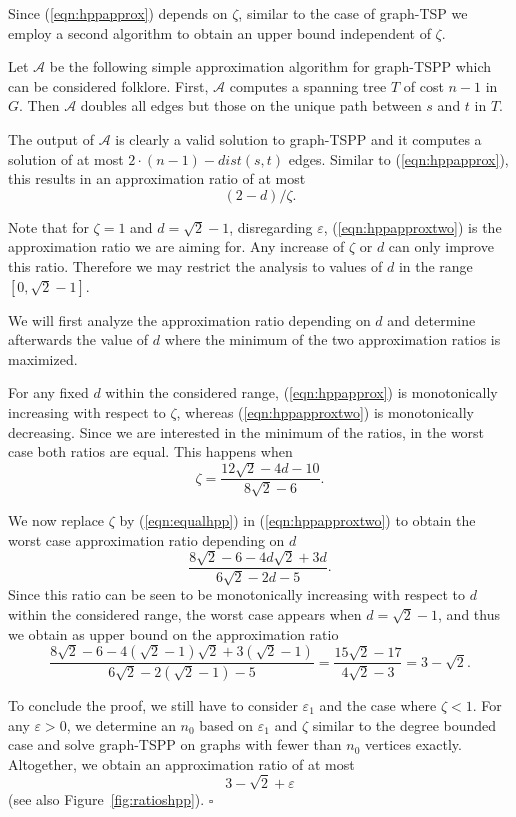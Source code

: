 \documentclass[letterpaper,11pt]{article}
\newenvironment{proof}{\begin{trivlist}
\item[\hskip\labelsep {\bf Proof}.]}{\QED \end{trivlist}}
\newcommand{\QED}{\hfill $\square$}
\newcommand{\TSP}{graph-TSP\xspace}
\newcommand{\HPP}{graph-TSPP\xspace}
\newcommand{\dist}[1]{\ensuremath{dist(#1)}}
\begin{document}
\begin{proof}
Since (\ref{eqn:hppapprox}) depends on $\zeta$, similar to the case of \TSP
we employ a second algorithm to obtain an upper bound independent of $\zeta$.

Let $\mathcal{A}$ be the following simple approximation algorithm for \HPP which
can be considered folklore.
First, $\mathcal{A}$ computes a spanning tree $T$ of cost $n-1$ in $G$. Then
$\mathcal{A}$ doubles all edges but those on the unique path between $s$ and $t$
in $T$.

The output of $\mathcal{A}$ is clearly a valid solution to \HPP and it computes
a solution of at most $2\cdot(n-1)-\dist{s,t}$ edges. Similar to
(\ref{eqn:hppapprox}), this results in an approximation ratio of at most
\begin{equation}\label{eqn:hppapproxtwo}
    (2-d)/\zeta.
\end{equation}

Note that for $\zeta=1$ and $d= \sqrt{2}-1$, disregarding $\varepsilon$,
(\ref{eqn:hppapproxtwo}) is the approximation ratio we are aiming for. Any
increase of $\zeta$ or $d$ can only improve this ratio. Therefore we may
restrict the analysis to values of $d$ in the range $[0,\sqrt{2}-1]$.

We will first analyze the approximation ratio depending on $d$ and determine
afterwards the value of $d$ where the minimum of the two
approximation ratios is maximized.

For any fixed $d$ within the considered range, (\ref{eqn:hppapprox}) is
monotonically increasing with respect to $\zeta$,
whereas (\ref{eqn:hppapproxtwo}) is monotonically decreasing. Since we are
interested in the minimum of the ratios, in the worst
case both ratios are equal. This happens when
\begin{equation}\label{eqn:equalhpp}
    \zeta = \frac{12\sqrt{2}-4d-10}{8\sqrt{2}-6}.
\end{equation}

We now replace $\zeta$
by (\ref{eqn:equalhpp}) in (\ref{eqn:hppapproxtwo}) to obtain the worst case
approximation ratio depending on $d$
\[
\frac{8\sqrt{2}-6-4d\sqrt{2}+3d}{6\sqrt{2}-2d-5}.
\]
Since this ratio can be seen to be monotonically increasing with respect to $d$ within the
considered range, the worst case appears when $d=\sqrt{2}-1$,
and thus we obtain as upper bound on the approximation ratio
\[
\frac{8\sqrt{2}-6-4(\sqrt{2}-1)\sqrt{2}+3(\sqrt{2}-1)}{6\sqrt{2}-2(\sqrt{2}-1)-5}
= \frac{15\sqrt{2}-17}{4\sqrt{2}-3} = 3 - \sqrt{2}.
\]

To conclude the proof, we still have to consider $\varepsilon_1$ and the case
where $\zeta<1$.
For any
$\varepsilon>0$, we determine an $n_0$ based on $\varepsilon_1$ and $\zeta$ similar to the degree bounded case and
solve \HPP on graphs with fewer than $n_0$ vertices exactly.
Altogether, we obtain an approximation ratio of
at most 
\[
3-\sqrt{2} + \varepsilon
\]
(see also Figure~\ref{fig:ratioshpp}).
\end{proof}
\end{document}
